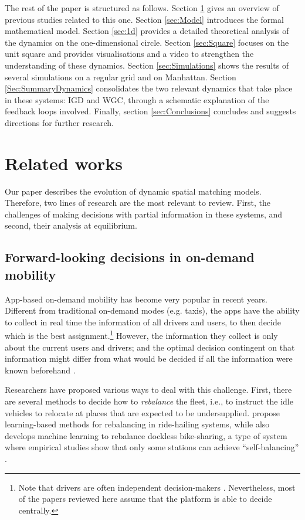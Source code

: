 \documentclass[12pt,english]{article}
\begin{document}
The rest of the paper is structured as follows. Section \ref{sec:LitReview} gives an overview of previous studies related to this one. Section \ref{sec:Model} introduces the formal mathematical model. Section \ref{sec:1d} provides a detailed theoretical analysis of the dynamics on the one-dimensional circle. Section \ref{sec:Square} focuses on the unit square and provides visualisations and a video to strengthen the understanding of these dynamics. Section \ref{sec:Simulations} shows the results of several simulations on a regular grid and on Manhattan. Section \ref{Sec:SummaryDynamics} consolidates the two relevant dynamics that take place in these systems: IGD and WGC, through a schematic explanation of the feedback loops involved. Finally, section \ref{sec:Conclusions} concludes and suggests directions for further research.

\section{Related works}\label{sec:LitReview}
Our paper describes the evolution of dynamic spatial matching models. Therefore, two lines of research are the most relevant to review. First, the challenges of making decisions with partial information in these systems, and second, their analysis at equilibrium.


\subsection{Forward-looking decisions in on-demand mobility}
App-based on-demand mobility has become very popular in recent years. Different from traditional on-demand modes (e.g. taxis), the apps have the ability to collect in real time the information of all drivers and users, to then decide which is the best assignment.\footnote{Note that drivers are often independent decision-makers \citep{ashkrof2022ride,ashkrof2024relocation}. Nevertheless, most of the papers reviewed here assume that the platform is able to decide centrally.} However, the information they collect is only about the current users and drivers; and the optimal decision contingent on that information might differ from what would be decided if all the information were known beforehand \citep{berbeglia_dynamic_2010}.

Researchers have proposed various ways to deal with this challenge. First, there are several methods to decide how to \textit{rebalance} the fleet, i.e., to instruct the idle vehicles to relocate at places that are expected to be undersupplied. \cite{guo2021robust,yang2022learning} propose learning-based methods for rebalancing in ride-hailing systems, while \cite{pan2019deep} also develops machine learning to rebalance dockless bike-sharing, a type of system where empirical studies show that only some stations can achieve ``self-balancing'' \citep{hua2025can}.
\end{document}
